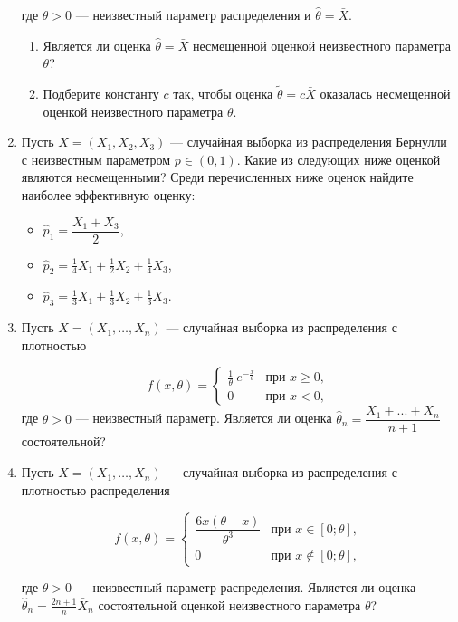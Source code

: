\documentclass[12pt]{article}
\begin{document}
\begin{enumerate}
где $\theta > 0$ — неизвестный параметр распределения и $\hat{\theta} = \bar{X}$.

\begin{enumerate}
\item Является ли оценка $\hat{\theta} = \bar{X}$ несмещенной оценкой неизвестного параметра $\theta$?
\item Подберите константу $c$ так, чтобы оценка $\tilde{\theta} = c\bar{X}$ оказалась несмещенной оценкой неизвестного параметра $\theta$. 
\end{enumerate}

\item Пусть $X = (X_1,X_2,X_3)$ — случайная выборка из распределения Бернулли с неизвестным параметром $p \in (0,1)$. Какие из следующих ниже оценкой являются несмещенными? Среди перечисленных ниже оценок найдите наиболее эффективную оценку:

\begin{itemize}
  \item $\hat{p}_1 = \dfrac{X_1+X_3}{2}$,
  \item $\hat{p}_2 = \frac{1}{4}X_1+\frac{1}{2}X_2+\frac{1}{4}X_3$,
  \item $\hat{p}_3 = \frac{1}{3}X_1+\frac{1}{3}X_2+\frac{1}{3}X_3$.
\end{itemize}

\item Пусть $X=(X_1, \ldots,X_n)$ — случайная выборка из распределения с плотностью 

\[
f(x,\theta) = 
\begin{cases} 
\frac{1}{\theta} \ e^{-\frac{x}{\theta}} & \text{при } x \geq 0, \\ 
0 & \text{при } x < 0, 
\end{cases}
\]
где $\theta > 0$ — неизвестный параметр. 
Является ли оценка  $\hat{\theta}_n = \dfrac{X_1+...+X_n}{n+1}$ состоятельной?

\item Пусть $X=(X_1, \ldots ,X_n)$ — случайная выборка из распределения с плотностью распределения

\[
f(x,\theta) = \begin{cases} 
\dfrac{6x(\theta-x)}{\theta^3} & \text{при } x \in [0;\theta], \\ 
0 & \text{при } x \not\in [0;\theta], \end{cases}
\]


где $\theta > 0$ — неизвестный параметр распределения. Является ли оценка \ $\hat{\theta}_n = \frac{2n+1}{n}\bar{X}_n$ состоятельной оценкой неизвестного параметра $\theta$?


\end{enumerate}
\end{document}
